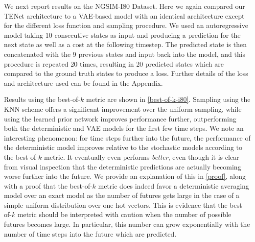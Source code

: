 \documentclass{article}
\begin{document}
We next report results on the NGSIM-I80 Dataset.
Here we again compared our TENet architecture to a VAE-based model with an identical architecture except for the different loss function and sampling procedure.
We used an autoregressive model taking 10 consecutive states as input and producing a prediction for the next state as well as a cost at the following timestep.
The predicted state is then concatenated with the 9 previous states and input back into the model, and this procedure is repeated 20 times, resulting in 20 predicted states which are compared to the ground truth states to produce a loss.
Further details of the loss and architecture used can be found in the Appendix.

Results using the best-of-$k$ metric are shown in \cref{best-of-k-i80}.
Sampling using the KNN scheme offers a significant improvement over the uniform sampling, while using the learned prior network improves performance further, outperforming both the deterministic and VAE models for the first few time steps.
We note an interesting phenomenon: for time steps further into the future, the performance of the deterministic model improves relative to the stochastic models according to the best-of-$k$ metric.
It eventually even performs \emph{better}, even though it is clear from visual inspection that the deterministic predictions are actually becoming worse further into the future.
We provide an explanation of this in \cref{proof}, along with a proof that the best-of-$k$ metric does indeed favor a deterministic averaging model over an exact model as the number of futures gets large in the case of a simple uniform distribution over one-hot vectors.
This is evidence that the best-of-$k$ metric should be interpreted with caution when the number of possible futures becomes large.
In particular, this number can grow exponentially with the number of time steps into the future which are predicted.
\end{document}
